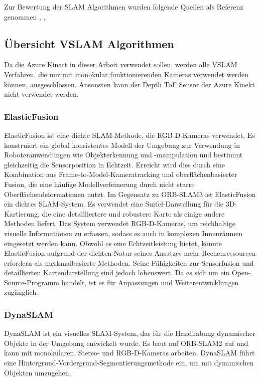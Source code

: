 Zur Bewertung der \ac{SLAM} Algorithmen wurden folgende Quellen als Referenz genommen \cite{ragot:hal-04071273}, \cite{Merzlyakov2021}, \cite{9440682}

\subsection{Übersicht VSLAM Algorithmen}\label{chp:übersicht-slamalgo}

Da die Azure Kinect in dieser Arbeit verwendet sollen, werden alle \ac{VSLAM} Verfahren, die nur mit monokular funktionierenden Kameras verwendet werden können, ausgeschlossen.
Ansonsten kann der Depth \ac{ToF} Sensor der Azure Kinekt nicht verwendet werden.

\subsubsection{ElasticFusion}


ElasticFusion ist eine dichte \ac{SLAM}-Methode, die \ac{RGB-D}-Kameras verwendet. Es konstruiert ein global konsistentes Modell der Umgebung zur Verwendung in Roboteranwendungen wie Objekterkennung und -manipulation und bestimmt gleichzeitig die Sensorposition in Echtzeit. Erreicht wird dies durch eine Kombination aus Frame-to-Model-Kameratracking und oberflächenbasierter Fusion, die eine häufige Modellverfeinerung durch nicht starre Oberflächendeformationen nutzt. 
Im Gegensatz zu ORB-SLAM3 ist ElasticFusion ein dichtes \ac{SLAM}-System. Es verwendet eine Surfel-Darstellung für die 3D-Kartierung, die eine detailliertere und robustere Karte als einige andere Methoden liefert. Das System verwendet \ac{RGB-D}-Kameras, um reichhaltige visuelle Informationen zu erfassen, sodass es auch in komplexen Innenräumen eingesetzt werden kann. Obwohl es eine Echtzeitleistung bietet, könnte ElasticFusion aufgrund der dichten Natur seines Ansatzes mehr Rechenressourcen erfordern als merkmalbasierte Methoden. Seine Fähigkeiten zur Sensorfusion und detaillierten Kartendarstellung sind jedoch lobenswert. Da es sich um ein Open-Source-Programm handelt, ist es für Anpassungen und Weiterentwicklungen zugänglich. \cite{elasticfusion}

\subsubsection{DynaSLAM}

DynaSLAM ist ein visuelles \ac{SLAM}-System, das für die Handhabung dynamischer Objekte in der Umgebung entwickelt wurde. Es baut auf ORB-SLAM2 auf und kann mit monokularen, Stereo- und \ac{RGB-D}-Kameras arbeiten. DynaSLAM führt eine Hintergrund-Vordergrund-Segmentierungsmethode ein, um mit dynamischen Objekten umzugehen.
\cite{bescos2018dynaslam}

